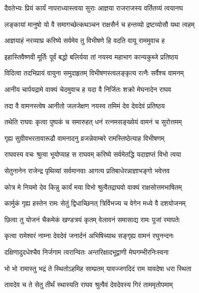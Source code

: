 \twolineshloka
{दैवतेभ्यः प्रियं कार्यं नापराध्यास्त्वया सुराः}
{आज्ञया राजराजस्य वर्तितव्यं त्वयानघ}%

\twolineshloka
{लङ्कायां मानुषो यो वै समागच्छेत्कथञ्चन}
{राक्षसैर्न च हन्तव्यो द्रष्टव्योसौ यथा त्वहम्}%


\twolineshloka
{आज्ञयाहं नरव्याघ्र करिष्ये सर्वमेव तु}
{विभीषणे हि वदति वायू राममुवाच ह}%

\twolineshloka
{इहास्तिवैष्णवी मूर्तिः पूर्वं बद्धो बलिर्यया}
{तां नयस्व महाभाग कान्यकुब्जे प्रतिष्ठय}%

\twolineshloka
{विदित्वा तदभिप्रायं वायुना समुदाहृतम्}
{विभीषणस्त्वलङ्कृत्य रत्नैः सर्वैश्च वामनम्}%

\twolineshloka
{आनीय चार्पयद्रामे वाक्यं चेदमुवाच ह}
{यदा वै निर्जितः शक्रो मेघनादेन राघव}%

\twolineshloka
{तदा वै वामनस्त्वेष आनीतो जलजेक्षण}
{नयस्व तमिमं देव देवदेवं प्रतिष्ठय}%

\twolineshloka
{तथेति राघवः कृत्वा पुष्पकं च समारुहत्}
{धनं रत्नमसङ्ख्येयं वामनं च सुरोत्तमम्}%

\twolineshloka
{गृह्य सुग्रीवभरतावारूढौ वामनादनु}
{व्रजन्नेवाम्बरे रामस्तिष्ठेत्याह विभीषणम्}%

\twolineshloka
{राघवस्य वचः श्रुत्वा भूयोप्याह स राघवम्}
{करिष्ये सर्वमेतद्धि यदाज्ञप्तं विभो त्वया}%

\twolineshloka
{सेतुनानेन राजेन्द्र पृथिव्यां सर्वमानवाः}
{आगत्य प्रतिबाधेरन्नाज्ञाभङ्गो भवेत्तव}%

\twolineshloka
{कोत्र मे नियमो देव किन्नु कार्यं मया विभो}
{श्रुत्वैतद्राघवो वाक्यं राक्षसोत्तमभाषितम्}%

\twolineshloka
{कार्मुकं गृह्य हस्तेन रामः सेतुं द्विधाच्छिनत्}
{त्रिर्विभज्य च वेगेन मध्ये वै दशयोजनम्}%

\twolineshloka
{छित्वा तु योजनं चैकमेकं खण्डत्रयं कृतम्}
{वेलावनं समासाद्य रामः पूजां रमापतेः}%

\twolineshloka
{कृत्वा रामेश्वरं नाम्ना देवदेवं जनार्दनं}
{अभिषिच्याथ सङ्गृह्य वामनं रघुनन्दनः}%

\twolineshloka
{दक्षिणादुदधेश्चैव निर्जगाम त्वरान्वितः}
{अन्तरिक्षादभूद्वाणी मेघगम्भीरनिःस्वना}%


\twolineshloka
{भो भो रामास्तु भद्रं ते स्थितोऽहमिह साम्प्रतम्}
{यावज्जगदिदं राम यावदेषा धरा स्थिता}%

\twolineshloka
{तावदेव च ते सेतु तीर्थं स्थास्यति राघव}
{श्रुत्वैवं देवदेवस्य गिरं ताममृतोपमाम्}%

